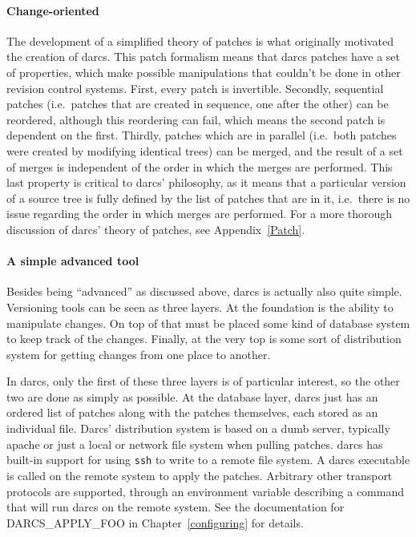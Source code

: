 \documentclass{book}
\begin{document}
\paragraph{Change-oriented}
The development of a simplified theory of patches is what originally
motivated the creation of darcs. This patch formalism means that darcs patches
have a set of properties, which make possible manipulations that couldn't be
done in other revision control systems. First, every patch is invertible.
Secondly, sequential patches (i.e.\ patches that are created in sequence, one
after the other) can be reordered, although this reordering can fail, which
means the second patch is dependent on the first. Thirdly, patches which are
in parallel (i.e.\ both patches were created by modifying identical trees)
can be merged, and the result of a set of merges is independent of the order
in which the merges are performed. This last property is critical to darcs'
philosophy, as it means that a particular version of a source tree is fully
defined by the list of patches that are in it, i.e.\ there is no issue
regarding the order in which merges are performed. For a more thorough
discussion of darcs' theory of patches, see Appendix~\ref{Patch}.


\paragraph{A simple advanced tool}
Besides being ``advanced'' as discussed above, darcs is actually also quite
simple. Versioning tools can be seen as three layers. At the foundation is
the ability to manipulate changes. On top of that must be placed some kind
of database system to keep track of the changes. Finally, at the very top is
some sort of distribution system for getting changes from one place to
another.

In darcs, only the first of these three layers is of particular interest,
so the other two are done as simply as possible.  At the database
layer, darcs just has an ordered list of patches along with the patches
themselves, each stored as an individual file.  Darcs' distribution system
is based on a dumb server, typically apache or just a local or network file
system when pulling patches.
darcs has built-in support for using \verb!ssh! to write to a remote file
system. A darcs executable is called on the remote system to apply the patches.
Arbitrary other transport protocols are supported, through an environment
variable describing a command that will run darcs on the remote system.
See the documentation for DARCS\_APPLY\_FOO in Chapter~\ref{configuring}
for details.
\end{document}
